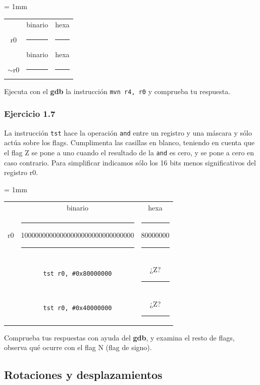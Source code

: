 \begin{center}
\small
\colorbox[gray]{0.9}{
\tabcolsep = 1mm
\begin{tabular}{ccc}
& binario & hexa \\
r0 & 
\colorbox[gray]{1}{\rule{6cm}{0cm}\rule{0cm}{0.46cm}} &
\colorbox[gray]{1}{\rule{2cm}{0cm}\rule{0cm}{0.46cm}} \\
& binario & hexa \\
$\sim$r0 & 
\colorbox[gray]{1}{\rule{6cm}{0cm}\rule{0cm}{0.46cm}} &
\colorbox[gray]{1}{\rule{2cm}{0cm}\rule{0cm}{0.46cm}} \\
\end{tabular}
}
\end{center}

Ejecuta con el {\bf gdb} la instrucción {\tt mvn r4, r0} y comprueba tu
respuesta.

\subsubsection{Ejercicio 1.7}
La instrucción {\tt tst} hace la operación {\tt and}
entre un registro y una máscara y sólo actúa sobre los flags.
Cumplimenta las casillas en blanco, teniendo en cuenta que el flag
Z se pone a uno cuando el resultado de la {\tt and} es cero, y
se pone a cero en caso contrario. Para simplificar indicamos
sólo los 16 bits menos significativos del registro r0.

\begin{center}
\small
\colorbox[gray]{0.9}{
\tabcolsep = 1mm
\begin{tabular}{ccc}
& binario & hexa \\
r0 &
\colorbox[gray]{1}{\rule{0.5cm}{0cm}\rule{0cm}{0.6cm}
10000000000000000000000000000000\rule{0.5cm}{0cm}} &
\colorbox[gray]{1}{\rule{0.5cm}{0cm}\rule{0cm}{0.6cm}80000000\rule{0.5cm}{0cm}}\\[1mm]
&{\tt tst r0, \#0x80000000}&¿Z? \colorbox[gray]{1}{\rule{1.5cm}{0cm}\rule{0cm}{0.6cm}}\\[1mm]
&{\tt tst r0, \#0x40000000}&¿Z? \colorbox[gray]{1}{\rule{1.5cm}{0cm}\rule{0cm}{0.6cm}}\\[1mm]
\end{tabular}
}
\end{center}

Comprueba tus respuestas con ayuda del {\bf gdb}, y examina el resto de flags,
observa qué ocurre con el flag N (flag de signo).

\subsection{Rotaciones y desplazamientos}

